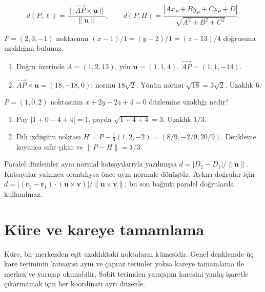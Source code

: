 {\small\[
d(P,\ell)=\frac{\|\overrightarrow{AP}\times\mathbf u\|}{\|\mathbf u\|},\qquad d(P,\Pi)=\frac{|Ax_P+By_P+Cz_P+D|}{\sqrt{A^2+B^2+C^2}}.
\]}
\begin{tcolorbox}[title={Örnek 2.8 | Tahtadaki nokta-doğru uzaklığı},colframe=accent]\(P=(2,3,-1)\) noktasının \((x-1)/1=(y-2)/1=(z-13)/4\) doğrusuna uzaklığını bulunuz.
\par{}\end{tcolorbox}
\begin{tcolorbox}[title={Adım adım çözüm},colback=green!3!white,colframe=green]\begin{enumerate}
\item Doğru üzerinde \(A=(1,2,13)\), yön \(\mathbf u=(1,1,4)\). \(\overrightarrow{AP}=(1,1,-14)\).
\item \(\overrightarrow{AP}\times\mathbf u=(18,-18,0)\); normu \(18\sqrt2\). Yönün normu \(\sqrt{18}=3\sqrt2\). Uzaklık 6.
\end{enumerate}\end{tcolorbox}
\begin{tcolorbox}[title={Örnek 2.9 | Çalışma sorusu: nokta-düzlem uzaklığı},colframe=accent]\(P=(1,0,2)\) noktasının \(x+2y-2z+4=0\) düzlemine uzaklığı nedir?
\par{}\end{tcolorbox}
\begin{tcolorbox}[title={Adım adım çözüm},colback=green!3!white,colframe=green]\begin{enumerate}
\item Pay \(|1+0-4+4|=1\), payda \(\sqrt{1+4+4}=3\). Uzaklık \(1/3\).
\item Dik izdüşüm noktası \(H=P-\frac{1}{9}(1,2,-2)=(8/9,-2/9,20/9)\). Denkleme koyunca sıfır çıkar ve \(\|P-H\|=1/3\).
\end{enumerate}\end{tcolorbox}
Paralel düzlemler aynı normal katsayılarıyla yazılmışsa \(d=|D_2-D_1|/\|\mathbf n\|\). Katsayılar yalnızca orantılıysa önce aynı normale dönüştür. Aykırı doğrular için \(d=|(\mathbf r_2-\mathbf r_1)\cdot(\mathbf u\times\mathbf v)|/\|\mathbf u\times\mathbf v\|\); bu son bağıntı paralel doğrularda kullanılmaz.

\section{Küre ve kareye tamamlama}
Küre, bir merkezden eşit uzaklıktaki noktaların kümesidir. Genel denklemde üç kare teriminin katsayısı aynı ve çapraz terimler yoksa kareye tamamlama ile merkez ve yarıçap okunabilir. Sabit terimden yarıçapın karesini yanlış işaretle çıkarmamak için her koordinatı ayrı düzenle.


